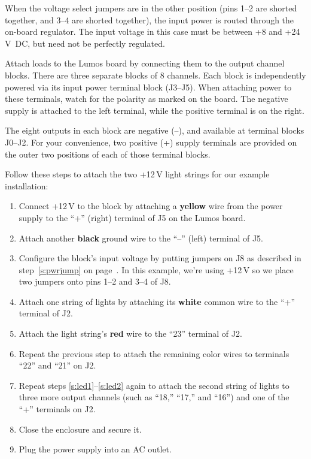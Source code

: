 \documentclass[letterpaper,twoside,onecolumn,openright,final]{memoir}
\begin{document}
\begin{enumerate}
\begin{description}
				When the voltage select jumpers are in the other position (pins 1--2 are
				shorted together, and 3--4 are shorted together), the input power is routed
				through the on-board regulator.  The input voltage in this case must be
				between +8 and +24\,V~DC, but need not be perfectly regulated.
		\end{description}
\end{enumerate}

Attach loads to the Lumos board by connecting them to the output channel blocks.  There are three separate
blocks of 8 channels.  Each block is independently powered via its input power terminal block (J3--J5).
When attaching power to these terminals, watch for the polarity as marked on the board.  The negative supply
is attached to the left terminal, while the positive terminal is on the right.

The eight outputs in each block are negative (--), and available at terminal blocks J0--J2.  
For your convenience, two positive (+) supply terminals
are provided on the outer two positions of each of those terminal blocks.

Follow these steps to attach the two +12\,V light strings for our example installation:

\begin{enumerate}
	\item 	Connect +12\,V to the block by attaching a {\bfseries yellow} wire from the power supply to
		the ``+'' (right) terminal of J5 on the Lumos board.

	\item	Attach another {\bfseries black} ground wire to the ``--'' (left) terminal of J5.

	\item	Configure the block's input voltage by putting jumpers on J8 as described in 
		step~\ref{s:pwrjump} on page~\pageref{s:pwrjump}.  In this example, we're using +12\,V so we place
		two jumpers onto pins 1--2 and 3--4 of J8.

	\item\label{s:led1}
		Attach one string of  lights by attaching its {\bfseries white} common wire to the ``+''
		terminal of J2.

	\item	Attach the light string's {\bfseries red} wire to the ``23'' terminal of J2.

	\item\label{s:led2}
		Repeat the previous step to attach the remaining color wires to terminals ``22'' and ``21'' on J2.

	\item	Repeat steps \ref{s:led1}--\ref{s:led2} again to attach the second string of lights to three
		more output channels (such as ``18,'' ``17,'' and ``16'') and one of the ``+'' terminals on J2.

	\item	Close the enclosure and secure it.

	\item	Plug the power supply into an AC outlet.
\end{enumerate}
\end{document}

